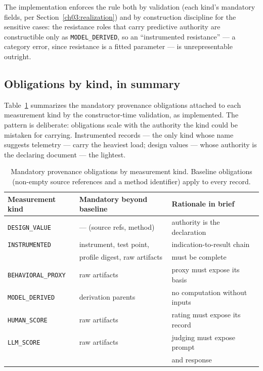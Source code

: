 The implementation enforces the rule both by validation (each kind's mandatory fields, per Section~\ref{ch03:realization}) and by construction discipline for the sensitive cases: the resistance roles that carry predictive authority are constructible only as \texttt{MODEL\_DERIVED}, so an ``instrumented resistance'' --- a category error, since resistance is a fitted parameter --- is unrepresentable outright.

\subsection{Obligations by kind, in summary}\label{ch03:measurement:table}

Table~\ref{ch03:tab:mkoblig} summarizes the mandatory provenance obligations attached to each measurement kind by the constructor-time validation, as implemented. The pattern is deliberate: obligations scale with the authority the kind could be mistaken for carrying. Instrumented records --- the only kind whose name suggests telemetry --- carry the heaviest load; design values --- whose authority is the declaring document --- the lightest.

\begin{table}[ht]
\centering
\small
\begin{tabular}{@{}lll@{}}
\toprule
Measurement kind & Mandatory beyond baseline & Rationale in brief \\
\midrule
\texttt{DESIGN\_VALUE} & --- (source refs, method) & authority is the declaration \\
\texttt{INSTRUMENTED} & instrument, test point, & indication-to-result chain \\
 & profile digest, raw artifacts & must be complete \\
\texttt{BEHAVIORAL\_PROXY} & raw artifacts & proxy must expose its basis \\
\texttt{MODEL\_DERIVED} & derivation parents & no computation without inputs \\
\texttt{HUMAN\_SCORE} & raw artifacts & rating must expose its record \\
\texttt{LLM\_SCORE} & raw artifacts & judging must expose prompt \\
 & & and response \\
\bottomrule
\end{tabular}
\caption{Mandatory provenance obligations by measurement kind. Baseline obligations (non-empty source references and a method identifier) apply to every record.}
\label{ch03:tab:mkoblig}
\end{table}

